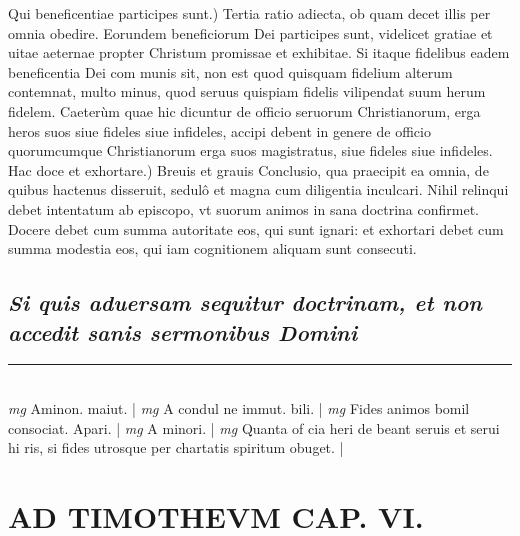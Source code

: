 \documentclass{article}
\begin{document}
\begin{pages}
 \pend\pstart Qui beneficentiae participes sunt.) Tertia ratio adiecta, ob quam decet illis per omnia obedire. Eorundem beneficiorum Dei participes sunt, videlicet gratiae et uitae aeternae propter Christum promissae et exhibitae. Si itaque fidelibus eadem beneficentia Dei com munis sit, non est quod quisquam fidelium alterum contemnat, multo minus, quod seruus quispiam fidelis vilipendat suum herum fidelem. Caeterùm quae hic dicuntur de officio seruorum Christianorum, erga heros suos siue fideles siue infideles, accipi debent in genere de officio quorumcumque Christianorum erga suos magistratus, siue fideles siue infideles.  \pend\pstart Hac doce et exhortare.) Breuis et grauis Conclusio, qua praecipit ea omnia, de quibus hactenus disseruit, sedulô et magna cum diligentia inculcari. Nihil relinqui debet intentatum ab episcopo, vt suorum animos in sana doctrina confirmet. Docere debet cum summa autoritate eos, qui sunt ignari: et exhortari debet cum summa modestia eos, qui iam cognitionem aliquam sunt consecuti.  \pend
{}
{}
\subsection*{\textit{Si quis aduersam sequitur doctrinam, et non accedit sanis sermonibus Domini }}\pstart  \pend
\vspace{0.5cm}\noindent
\vspace{0.2cm}\rule{1cm}{0.2pt}\\ 
\hspace{0.2cm}\textit{mg}
\footnotesize Aminon. maiut. 
\normalsize| 
\hspace{0.2cm}\textit{mg}
\footnotesize A condul ne immut. bili. 
\normalsize| 
\hspace{0.2cm}\textit{mg}
\footnotesize Fides animos bomil consociat. Apari. 
\normalsize| 
\hspace{0.2cm}\textit{mg}
\footnotesize A minori. 
\normalsize| 
\hspace{0.2cm}\textit{mg}
\footnotesize Quanta of cia heri de beant seruis et serui hi ris, si fides utrosque per chartatis spiritum obuget. 
\normalsize| 
\section*{AD TIMOTHEVM CAP. VI. }
\marginpar{[ p.121 ]}
{}

\end{pages}
\end{document}
